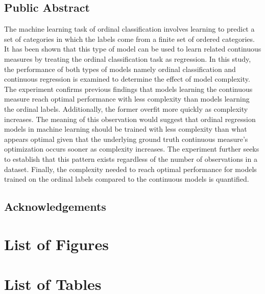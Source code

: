 \documentclass[10pt]{article}\usepackage[]{graphicx}\usepackage[]{xcolor}
\begin{document}
\Large\begin{center}
\section*{Public Abstract}
\end{center}
The machine learning task of ordinal classification involves learning to predict a set of categories in which the labels come from a finite set of ordered categories. It has been shown that this type of model can be used to learn related continuous measures by treating the ordinal classification task as regression. In this study, the performance of both types of models namely ordinal classification and continuous regression is examined to determine the effect of model complexity. The experiment confirms previous findings that models learning the continuous measure reach optimal performance with less complexity than models learning the ordinal labels. Additionally, the former overfit more quickly as complexity increases. The meaning of this observation would suggest that ordinal regression models in machine learning should be trained with less complexity than what appears optimal given that the underlying ground truth continuous measure's optimization occurs sooner as complexity increases. The experiment further seeks to establish that this pattern exists regardless of the number of observations in a dataset. Finally, the complexity needed to reach optimal performance for models trained on the ordinal labels compared to the continuous models is quantified.
\newpage


\Large\begin{center}
\section*{Acknowledgements}
\end{center}
\newpage


\newpage
\begin{singlespace}
\tableofcontents
\newpage


\section*{List of Figures}
\makeatletter
\renewcommand\listoffigures{%
}
\makeatother
\listoffigures
{}
\newpage

\section*{List of Tables}
\makeatletter
\renewcommand\listoftables{%
}
\makeatother
\listoftables
\end{singlespace}
\newpage
\end{document}
